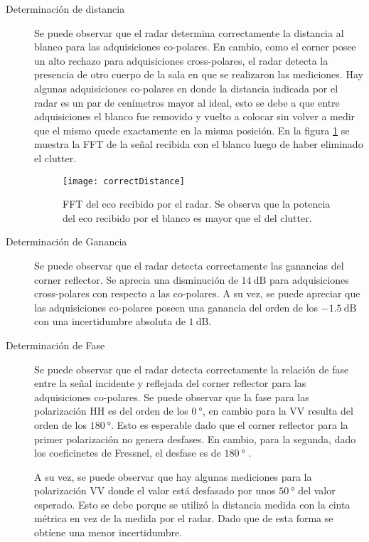 \begin{description}
  \item[Determinación de distancia] Se puede observar que el radar determina correctamente la distancia al blanco para las adquisiciones co-polares. En cambio, como el corner posee un alto rechazo para adquisiciones cross-polares, el radar detecta la presencia de otro cuerpo de la sala en que se realizaron las mediciones. Hay algunas adquisiciones co-polares en donde la distancia indicada por el radar es un par de cenímetros mayor al ideal, esto se debe a que entre adquisiciones el blanco fue removido y vuelto a colocar sin volver a medir que el mismo quede exactamente en la misma posición. En la figura \ref{fig:correctDistance} se muestra la FFT de la señal recibida con el blanco luego de haber eliminado el clutter.

  \begin{figure}[htb]
    \centering
    \texttt{[image: correctDistance]}
    \caption{FFT del eco recibido por el radar. Se observa que la potencia del eco recibido por el blanco es mayor que el del clutter.}
    \label{fig:correctDistance}
  \end{figure}

  \item[Determinación de Ganancia] Se puede observar que el radar detecta correctamente las ganancias del corner reflector. Se aprecia una disminución de $\SI{14}{\dB}$ para adquisiciones cross-polares con respecto a las co-polares. A su vez, se puede apreciar que las adquisiciones co-polares poseen una ganancia del orden de los $\SI{-1.5}{\dB}$ con una incertidumbre absoluta de $\SI{1}{\dB}$.

  \item[Determinación de Fase] Se puede observar que el radar detecta correctamente la relación de fase entre la señal incidente y reflejada del corner reflector para las adquisiciones co-polares. Se puede observar que la fase para las polarización HH es del orden de los $\SI{0}{\degree}$, en cambio para la VV resulta del orden de los $\SI{180}{\degree}$. Esto es esperable dado que el corner reflector para la primer polarización no genera desfases. En cambio, para la segunda, dado los coeficinetes de Fressnel, el desfase es de $\SI{180}{\degree}$ \cite{Michelson1993}.

  A su vez, se puede observar que hay algunas mediciones para la polarización VV donde el valor está desfasado por unos $\SI{50}{\degree}$ del valor esperado. Esto se debe porque se utilizó la distancia medida con la cinta métrica en vez de la medida por el radar. Dado que de esta forma se obtíene una menor incertidumbre.
\end{description}



